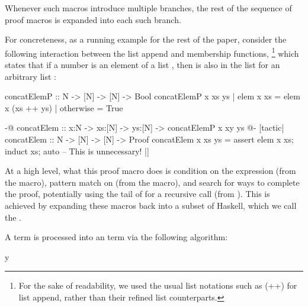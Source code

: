 Whenever such macros
introduce multiple branches, the rest of the sequence of proof macros
is expanded into each such branch.



For concreteness, as a running example for the rest of the paper, consider
the following interaction between the list append and membership functions,
\footnote{For the sake of readability, we used the usual list
  notations such as (++) for list append, rather than their refined
  list counterparts.}%
%
which states that if a number  is an element of a list ,
then  is also in the list  for an arbitrary list :
\begin{code}
  concatElemP :: N -> [N] -> [N] -> Bool
  concatElemP x xs ys
    | elem x xs = elem x (xs ++ ys)
    | otherwise = True

  {-@ concatElem :: x:N -> xs:[N] -> ys:[N] ->
      {concatElemP x xy ys} @-}
  [tactic|
  concatElem :: N -> [N] -> [N] -> Proof
  concatElem x xs ys =
    assert {elem x xs};
    induct xs;
    auto -- This is unnecessary!
  |]
\end{code}

At a high level, what this proof macro does is condition on the
expression  (from the  macro), pattern match
on  (from the  macro), and search for ways to
complete the proof, potentially using the tail of  for a
recursive call (from ). This is achieved by expanding these
macros back into a subset of Haskell, which we call the {\em \LangB}.





A \LangA term is processed into an \LangB term via the following algorithm:


y


